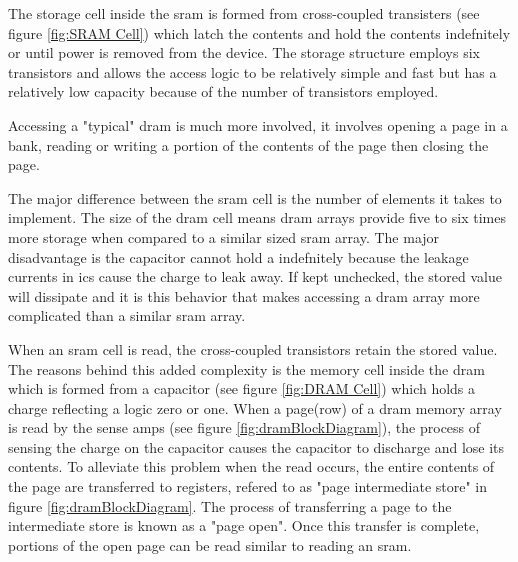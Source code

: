 The storage cell inside the \ac{sram} is formed from cross-coupled transisters (see figure \ref{fig:SRAM Cell}) which latch the contents and hold the contents indefnitely or until power is removed from the device.
The storage structure employs six transistors and allows the access logic to be relatively simple and fast but has a relatively low capacity because of the number of transistors employed.

Accessing a "typical" \ac{dram} is much more involved, it involves opening a page in a bank, reading or writing a portion of the contents of the page then closing the page. 

The major difference between the \ac{sram} cell is the number of elements it takes to implement. The size of the \ac{dram} cell means \ac{dram} arrays provide five to six times more storage when compared to a similar sized \ac{sram} array.
The major disadvantage is the capacitor cannot hold a indefnitely because the leakage currents in \acp{ic} cause the charge to leak away. If kept unchecked, the stored value will dissipate and it is this behavior that makes accessing a \ac{dram} array more complicated than a similar \ac{sram} array.

When an \ac{sram} cell is read, the cross-coupled transistors retain the stored value. 
The reasons behind this added complexity is the memory cell inside the \ac{dram} which is formed from a capacitor (see figure \ref{fig:DRAM Cell}) which holds a charge reflecting a logic zero or one. 
When a page(row) of a \ac{dram} memory array is read by the sense amps (see figure \ref{fig:dramBlockDiagram}), the process of sensing the charge on the capacitor causes the capacitor to discharge and lose its contents. 
To alleviate this problem \iffalse \ac{dram} arrays are formed from a column of storage elements known as a page. \fi when the read occurs, the entire contents of the page are transferred to registers, refered to as "page intermediate store" in figure \ref{fig:dramBlockDiagram}. 
The process of transferring a page to the intermediate store is known as a "page open".
Once this transfer is complete, portions of the open page can be read similar to reading an \ac{sram}. 

\iffalse
The value charged on the capacitors are transferred to the page intermediate store and all further reads and writes are to this intermediate store. 

When a different page is accessed, the contents of the page intermediate store has to be returned to the memory array and the capacitors recharged.
The new page can then be transferred to the intermediate store for accessing.
\fi


